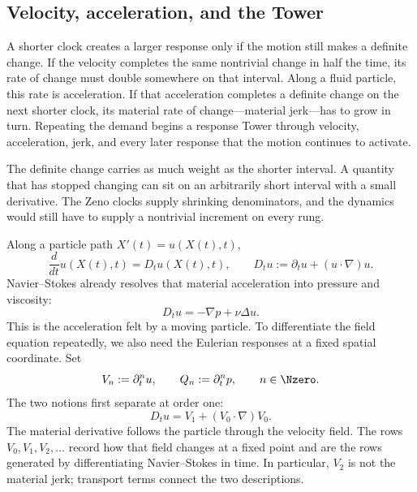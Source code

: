 \subsection{Velocity, acceleration, and the Tower}\label{sub:BodyFiniteTimeResponseEscalation}

A shorter clock creates a larger response only if the motion still makes a definite change.
If the velocity completes the same nontrivial change in half the time, its rate of change must double somewhere on that interval.
Along a fluid particle, this rate is acceleration.
If that acceleration completes a definite change on the next shorter clock, its material rate of change---material jerk---has to grow in turn.
Repeating the demand begins a response Tower through velocity, acceleration, jerk, and every later response that the motion continues to activate.

The definite change carries as much weight as the shorter interval.
A quantity that has stopped changing can sit on an arbitrarily short interval with a small derivative.
The Zeno clocks supply shrinking denominators, and the dynamics would still have to supply a nontrivial increment on every rung.

Along a particle path \(X'(t)=u(X(t),t)\),
\[
  \frac{d}{dt}u(X(t),t)
  =D_tu(X(t),t),
  \qquad
  D_tu:=\partial_tu+(u\cdot\nabla)u.
\]
Navier--Stokes already resolves that material acceleration into pressure and viscosity:
\begin{equation}\label{eq:MaterialAccelerationEquationBody}
  D_tu=-\nabla p+\nu\Delta u.
\end{equation}
This is the acceleration felt by a moving particle.
To differentiate the field equation repeatedly, we also need the Eulerian responses at a fixed spatial coordinate.
Set
\begin{equation}\label{eq:TemporalTowerDefinitionBody}
  V_n:=\partial_t^nu,
  \qquad
  Q_n:=\partial_t^np,
  \qquad
  n\in\Nzero.
\end{equation}
The two notions first separate at order one:
\[
  D_tu=V_1+(V_0\cdot\nabla)V_0.
\]
The material derivative follows the particle through the velocity field.
The rows \(V_0,V_1,V_2,\ldots\) record how that field changes at a fixed point and are the rows generated by differentiating Navier--Stokes in time.
In particular, \(V_2\) is not the material jerk; transport terms connect the two descriptions.

